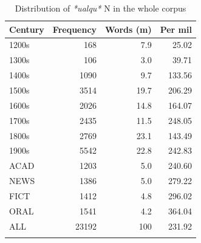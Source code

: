 \begin{table}
\caption{Distribution of \textit{*ualqu*} N in the whole corpus}
\label{tab:extracted4}
\begin{tabular}{lrrr}
\lsptoprule
Century &  Frequency &  Words (m) &  Per mil\\
\midrule
 1200s &  168 & 7.9 & 25.02 \\
 1300s &  106 & 3.0 & 39.71 \\
 1400s &  1090 & 9.7 &  133.56 \\
 1500s & 3514 &  19.7 & 206.29 \\
 1600s & 2026 &  14.8 &  164.07 \\
 1700s & 2435 &  11.5 & 248.05 \\
 1800s & 2769 & 23.1 &  143.49 \\
 1900s & 5542 & 22.8 & 242.83 \\
 \tablevspace
 ACAD &  1203 & 5.0 & 240.60 \\
 NEWS &  1386 & 5.0 & 279.22 \\
 FICT &  1412 & 4.8 & 296.02 \\
 ORAL &  1541  & 4.2  & 364.04 \\
 \midrule
ALL & 23192 &  100 & 231.92 \\
\lspbottomrule
\end{tabular}
\end{table}

